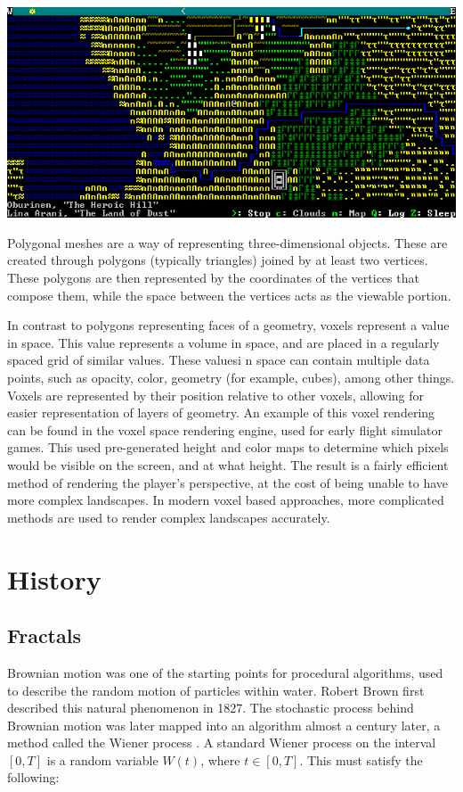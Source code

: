 \documentclass[10pt]{report}
\begin{document}
		\begin{minipage}{\textwidth}
			\centering
			\includegraphics[scale=.5]{dwarf_fortress}
			\label{fig:asciidf}
		\end{minipage}
		
		Polygonal meshes are a way of representing three-dimensional objects. These are created through polygons (typically triangles) joined by at least two vertices. These polygons are then represented by the coordinates of the vertices that compose them, while the space between the vertices acts as the viewable portion.
		
		In contrast to polygons representing faces of a geometry, voxels represent a value in space. This value represents a volume in space, and are placed in a regularly spaced grid of similar values. These valuesi n space can contain multiple data points, such as opacity, color, geometry (for example, cubes), among other things. Voxels are represented by their position relative to other voxels, allowing for easier representation of layers of geometry. An example of this voxel rendering can be found in the voxel space rendering engine, used for early flight simulator games. This used pre-generated height and color maps to determine which pixels would be visible on the screen, and at what height. The result is a fairly efficient method of rendering the player's perspective, at the cost of being unable to have more complex landscapes. In modern voxel based approaches, more complicated methods are used to render complex landscapes accurately.
		
	\vspace{10pt}
	\let\clearpage\relax
	\chapter{History}
	
		\section{Fractals}
		Brownian motion was one of the starting points for procedural algorithms, used to describe the random motion of particles within water. Robert Brown first described this natural phenomenon in 1827. The stochastic process behind Brownian motion was later mapped into an algorithm almost a century later, a method called the Wiener process \cite{inbook}. A standard Wiener process on the interval \([0,T]\) is a random variable \(W(t)\), where \(t \in [0,T]\). This must satisfy the following:
		
\end{document}

